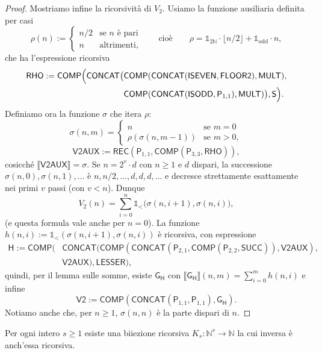 \begin{proof}
Mostriamo infine la ricorsività di $V_2$. Usiamo la funzione ausiliaria definita per casi
\[
\rho(n):=\begin{cases}n/2 & \text{se } n \text{ è pari}\\ n & \text{altrimenti,}\end{cases}
\qquad\text{cioè}\qquad \rho=\mathbb 1_{2\mathbb N}\cdot\lfloor n/2\rfloor+\mathbb 1_{\mathrm{odd}}\cdot n,
\]
che ha l'espressione ricorsiva
\[
\begin{aligned}
\mathsf{RHO}:=\mathsf{COMP}\Bigl(\mathsf{CONCAT}\bigl(&\mathsf{COMP}(\mathsf{CONCAT}(\mathsf{ISEVEN},\mathsf{FLOOR2}),\mathsf{MULT}),\\
&\mathsf{COMP}(\mathsf{CONCAT}(\mathsf{ISODD},\mathsf P_{1,1}),\mathsf{MULT})\bigr),\mathsf S\Bigr).
\end{aligned}
\]
Definiamo ora la funzione $\sigma$ che itera $\rho$:
\[
\sigma(n,m)=\begin{cases}n & \text{se } m=0\\ \rho(\sigma(n,m-1)) & \text{se } m>0,\end{cases}
\]
\[
\mathsf{V2AUX}:=\mathsf{REC}(\mathsf P_{1,1},\mathsf{COMP}(\mathsf P_{3,3},\mathsf{RHO})),
\]
cosicché $\llbracket\mathsf{V2AUX}\rrbracket=\sigma$. Se $n=2^v\cdot d$ con $n\ge1$ e $d$ dispari, la successione $\sigma(n,0),\sigma(n,1),\dots$ è $n,n/2,\dots,d,d,d,\dots$ e decresce strettamente esattamente nei primi $v$ passi (con $v<n$). Dunque
\[
V_2(n)=\sum_{i=0}^{n}\mathbb 1_{<}\bigl(\sigma(n,i+1),\sigma(n,i)\bigr),
\]
(e questa formula vale anche per $n=0$). La funzione $h(n,i):=\mathbb 1_{<}(\sigma(n,i+1),\sigma(n,i))$ è ricorsiva, con espressione
\[
\begin{aligned}
\mathsf H:=\mathsf{COMP}\bigl(&\mathsf{CONCAT}(\mathsf{COMP}(\mathsf{CONCAT}(\mathsf P_{2,1},\mathsf{COMP}(\mathsf P_{2,2},\mathsf{SUCC})),\mathsf{V2AUX}),\\
&\mathsf{V2AUX}),\mathsf{LESSER}\bigr),
\end{aligned}
\]
quindi, per il lemma sulle somme, esiste $\mathsf G_{\mathsf H}$ con $\llbracket\mathsf G_{\mathsf H}\rrbracket(n,m)=\sum_{i=0}^m h(n,i)$ e infine
\[
\mathsf{V2}:=\mathsf{COMP}(\mathsf{CONCAT}(\mathsf P_{1,1},\mathsf P_{1,1}),\mathsf G_{\mathsf H}).
\]
Notiamo anche che, per $n\ge1$, $\sigma(n,n)$ è la parte dispari di $n$.
\end{proof}

\begin{prop}
Per ogni intero $s\ge1$ esiste una biiezione ricorsiva $K_s\colon\mathbb N^s\to\mathbb N$ la cui inversa è anch'essa ricorsiva.
\end{prop}

